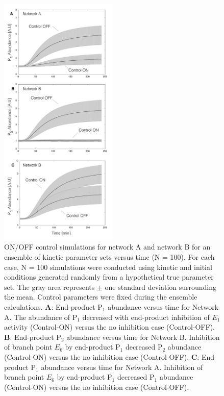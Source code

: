 \documentclass[12pt]{article}
\begin{document}
\begin{figure}
\centering
\includegraphics[width=0.50\textwidth]{./figs/Figure-4-OnOffSimulations.pdf}
\caption{ON/OFF control simulations for network A and network B for an ensemble of kinetic parameter sets versus time (N = 100). 
For each case, N = 100 simulations were conducted using kinetic and initial conditions generated randomly from a hypothetical true parameter set. 
The gray area represents $\pm$ one standard deviation surrounding the mean. 
Control parameters were fixed during the ensemble calculations.
\textbf{A}: End-product P$_{1}$ abundance versus time for Network A. 
The abundance of P$_{1}$ decreased with end-product inhibition of $E_{1}$ activity (Control-ON) versus the no inhibition case (Control-OFF). 
\textbf{B}: End-product P$_{2}$ abundance versus time for Network B. Inhibition of branch point $E_{6}$ by end-product P$_{1}$ decreased P$_{2}$ abundance (Control-ON) versus the
no inhibition case (Control-OFF).
\textbf{C}: End-product P$_{1}$ abundance versus time for Network A. 
Inhibition of branch point $E_{6}$ by end-product P$_{1}$ decreased P$_{1}$ abundance (Control-ON) versus the no inhibition case (Control-OFF).
}\label{fig-onoff-simulations}
\end{figure}
\end{document}
